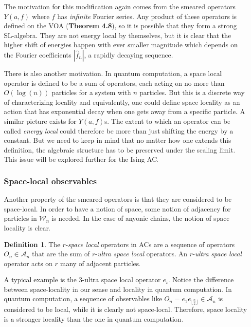 \documentclass[twoside,11pt,titlepage]{amsart}
\renewcommand{\=}[1]{\stackrel{#1}{=}} %
\theoremstyle{definition}
\newtheorem{dfn}{Definition}
\theoremstyle{remark}
\begin{document}
The motivation for this modification again comes from the smeared operators $Y(a,f)$ where $f$ has \textit{infinite} Fourier series. Any product of these operators is defined on the VOA (\hyperref[thm4.8]{\textbf{Theorem 4.8}}), so it is possible that they form a strong SL-algebra. They are not energy local by themselves, but it is clear that the higher shift of energies happen with ever smaller magnitude which depends on the Fourier coefficients $|\hat{f}_n|$, a rapidly decaying sequence. 

There is also another motivation. In quantum computation, a space local operator is defined to be a sum of operators, each acting on no more than $O(\log(n))$ particles for a system with $n$ particles. But this is a discrete way of characterizing locality and equivalently, one could define space locality as an action that has exponential decay when one gets away from a specific particle. A similar picture exists for $Y(a,f)$s. The extent to which an operator can be called \textit{energy local} could therefore be more than just shifting the energy by a constant. But we need to keep in mind that no matter how one extends this definition, the algebraic structure has to be preserved under the scaling limit. This issue will be explored further for the Ising AC.


\subsubsection{Space-local observables}

\hfill \break 
Another property of the smeared operators is that they are considered to be space-local. In order to have a notion of space, some notion of adjacency for particles in $\mathcal{W}_n$ is needed. In the case of anyonic chains, the notion of space locality is clear.
\begin{dfn}\label{dfn11}
The $r$-\textit{space local} operators in ACs are a sequence of operators $O_n \in \mathcal{A}_n$ that are the sum of $r$-\textit{ultra space local} operators. An $r$-\textit{ultra space local} operator acts on $r$ many of adjacent particles. 
\end{dfn}
A typical example is the $3$-ultra space local operator $e_i$. Notice the difference between space-locality in our sense and locality in quantum computation. In quantum computation, a sequence of observables like $O_n=e_1e_{\lfloor \frac{n}{2} \rfloor} \in \mathcal{A}_n$ is considered to be local, while it is clearly not space-local. Therefore, space locality is a stronger locality than the one in quantum computation.
\end{document}
